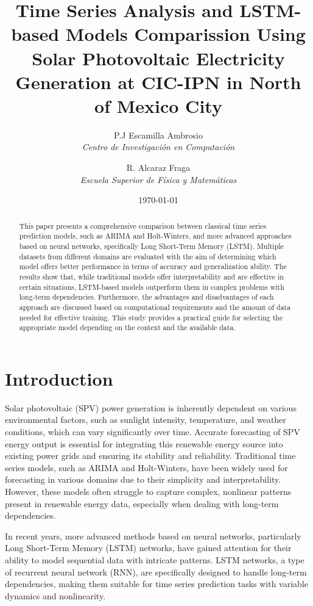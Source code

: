 \documentclass[a4paper,12pt]{article}
\title{Time Series Analysis and LSTM-based Models Comparission Using Solar Photovoltaic Electricity
Generation at CIC-IPN in North of Mexico City}
\author{P.J Escamilla Ambrosio\\
        \textit{Centro de Investigación en Computación}\\
        \and
        R. Alcaraz Fraga\\
        \textit{Escuela Superior de Física y Matemáticas}\\
        }
\date{\today}
\begin{document}
\maketitle

\begin{abstract}
This paper presents a comprehensive comparison between classical time series prediction models, such as ARIMA and Holt-Winters, and more advanced approaches based on neural networks, specifically Long Short-Term Memory (LSTM). Multiple datasets from different domains are evaluated with the aim of determining which model offers better performance in terms of accuracy and generalization ability. The results show that, while traditional models offer interpretability and are effective in certain situations, LSTM-based models outperform them in complex problems with long-term dependencies. Furthermore, the advantages and disadvantages of each approach are discussed based on computational requirements and the amount of data needed for effective training. This study provides a practical guide for selecting the appropriate model depending on the context and the available data.
\end{abstract}

\section{Introduction}
Solar photovoltaic (SPV) power generation is inherently dependent on various environmental factors, such as sunlight intensity, temperature, and weather conditions, which can vary significantly over time. Accurate forecasting of SPV energy output is essential for integrating this renewable energy source into existing power grids and ensuring its stability and reliability. Traditional time series models, such as ARIMA and Holt-Winters, have been widely used for forecasting in various domains due to their simplicity and interpretability. However, these models often struggle to capture complex, nonlinear patterns present in renewable energy data, especially when dealing with long-term dependencies.

In recent years, more advanced methods based on neural networks, particularly Long Short-Term Memory (LSTM) networks, have gained attention for their ability to model sequential data with intricate patterns. LSTM networks, a type of recurrent neural network (RNN), are specifically designed to handle long-term dependencies, making them suitable for time series prediction tasks with variable dynamics and nonlinearity.
\end{document}
